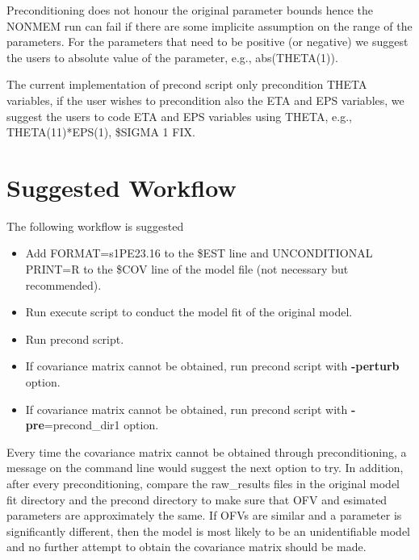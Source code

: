 Preconditioning does not honour the original parameter bounds hence the NONMEM run can fail if there are some implicite assumption on the range of the parameters.  For the parameters that need to be positive (or negative) we suggest the users to absolute value of the parameter, e.g., abs(THETA(1)).

The current implementation of precond script only precondition THETA variables, if the user wishes to precondition also the ETA and EPS variables, we suggest the users to code ETA and EPS variables using THETA, e.g., THETA(11)*EPS(1), \$SIGMA 1 FIX.

\section{Suggested Workflow}
The following workflow is suggested

\begin{itemize}
\item Add FORMAT=s1PE23.16 to the \$EST line and UNCONDITIONAL PRINT=R to the \$COV line of the model file (not necessary but recommended).
\item Run execute script to conduct the model fit of the original model.
\item Run precond script.
\item If covariance matrix cannot be obtained, run precond script with {\bf -perturb} option.
\item If covariance matrix cannot be obtained, run precond script with {\bf -pre}=precond\_dir1 option.
\end{itemize}

Every time the covariance matrix cannot be obtained through preconditioning, a message on the command line would suggest the next option to try.  In addition, after every preconditioning, compare the raw\_results files in the original model fit directory and the precond directory to make sure that OFV and esimated parameters are approximately the same.  If OFVs are similar and a parameter is significantly different, then the model is most likely to be an unidentifiable model and no further attempt to obtain the covariance matrix should be made.


